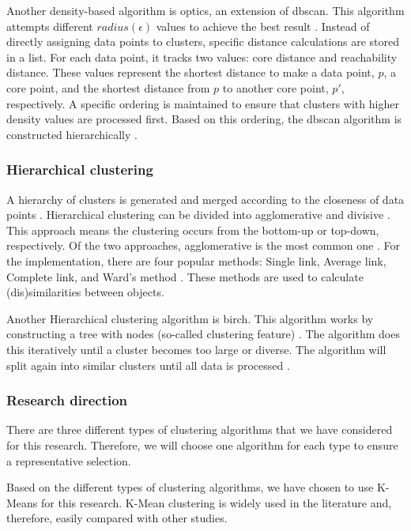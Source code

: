 Another density-based algorithm is \gls{optics}, an extension of \gls{dbscan}.
This algorithm attempts different $radius(\epsilon)$ values to achieve the best result \citep{ankerst_optics_nodate}.
Instead of directly assigning data points to clusters, specific distance calculations are stored in a list.
For each data point, it tracks two values: core distance and reachability distance.
These values represent the shortest distance to make a data point, $p$, a core point, and the shortest distance from $p$ to another core point, $p'$, respectively.
A specific ordering is maintained to ensure that clusters with higher density values are processed first.
Based on this ordering, the \gls{dbscan} algorithm is constructed hierarchically \citep{schubert_dbscan_2017}.


\subsubsection{Hierarchical clustering}
A hierarchy of clusters is generated and merged according to the closeness of data points \citep{meng_private_2021}.
Hierarchical clustering can be divided into agglomerative and divisive \citep{meng_private_2021}.
This approach means the clustering occurs from the bottom-up or top-down, respectively.
Of the two approaches, agglomerative is the most common one \citep{meng_private_2021}.
For the implementation, there are four popular methods: Single link, Average link, Complete link, and Ward's method \citep{roux_comparative_2015}.
These methods are used to calculate (dis)similarities between objects.

Another Hierarchical clustering algorithm is \gls{birch}.
This algorithm works by constructing a tree with nodes (so-called clustering feature) \citep{zhang_birch_1996}.
The algorithm does this iteratively until a cluster becomes too large or diverse.
The algorithm will split again into similar clusters until all data is processed \citep{zhang_birch_1996}.
\subsubsection{Research direction}
There are three different types of clustering algorithms that we have considered for this research.
Therefore, we will choose one algorithm for each type to ensure a representative selection.

Based on the different types of clustering algorithms, we have chosen to use K-Means for this research.
K-Mean clustering is widely used in the literature and, therefore, easily compared with other studies.

